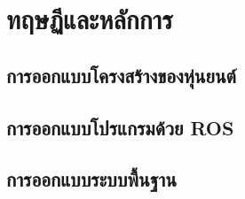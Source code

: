 \chapter{ทฤษฏีและหลักการ}





\clearpage
\section{การออกแบบโครงสร้างของหุ่นยนต์}


\section{การออกแบบโปรแกรมด้วย ROS}


\section{การออกแบบระบบพื้นฐาน}

